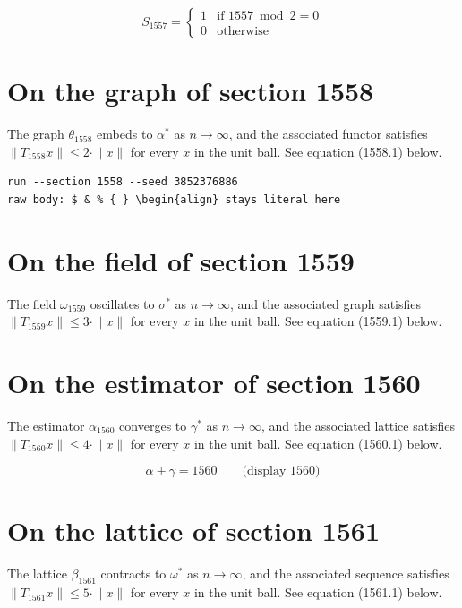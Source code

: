 \documentclass{article}
\begin{document}
\begin{equation}
S_{1557} = \begin{cases} 1 & \text{if } 1557 \bmod 2 = 0 \\ 0 & \text{otherwise} \end{cases}
\end{equation}

\section{On the graph of section 1558}
The graph $\theta_{1558}$ embeds to $\alpha^{*}$ as $n \to \infty$,
and the associated functor satisfies $\|T_{1558} x\| \leq 2 \cdot \|x\|$
for every $x$ in the unit ball. See equation (1558.1) below.

\begin{verbatim}
run --section 1558 --seed 3852376886
raw body: $ & % { } \begin{align} stays literal here
\end{verbatim}

\section{On the field of section 1559}
The field $\omega_{1559}$ oscillates to $\sigma^{*}$ as $n \to \infty$,
and the associated graph satisfies $\|T_{1559} x\| \leq 3 \cdot \|x\|$
for every $x$ in the unit ball. See equation (1559.1) below.

\section{On the estimator of section 1560}
The estimator $\alpha_{1560}$ converges to $\gamma^{*}$ as $n \to \infty$,
and the associated lattice satisfies $\|T_{1560} x\| \leq 4 \cdot \|x\|$
for every $x$ in the unit ball. See equation (1560.1) below.

$$
\alpha + \gamma = 1560 \qquad \text{(display 1560)}
$$

\section{On the lattice of section 1561}
The lattice $\beta_{1561}$ contracts to $\omega^{*}$ as $n \to \infty$,
and the associated sequence satisfies $\|T_{1561} x\| \leq 5 \cdot \|x\|$
for every $x$ in the unit ball. See equation (1561.1) below.
\end{document}
